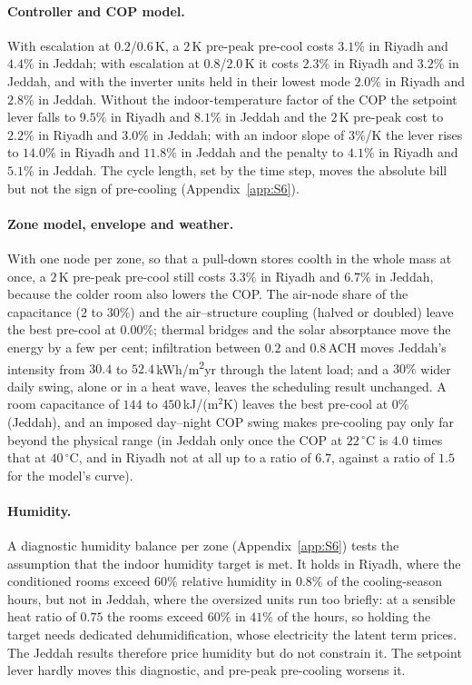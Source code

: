 \documentclass[10pt,a4paper,twocolumn]{article}
\theoremstyle{definition}
\begin{document}
\paragraph{Controller and COP model.} With escalation at $0.2$/$0.6\,$K, a $2\,$K pre-peak pre-cool costs $3.1\%$ in Riyadh and $4.4\%$ in Jeddah; with escalation at $0.8$/$2.0\,$K it costs $2.3\%$ in Riyadh and $3.2\%$ in Jeddah, and with the inverter units held in their lowest mode $2.0\%$ in Riyadh and $2.8\%$ in Jeddah. Without the indoor-temperature factor of the COP the setpoint lever falls to $9.5\%$ in Riyadh and $8.1\%$ in Jeddah and the $2\,$K pre-peak cost to $2.2\%$ in Riyadh and $3.0\%$ in Jeddah; with an indoor slope of $3\%$/K the lever rises to $14.0\%$ in Riyadh and $11.8\%$ in Jeddah and the penalty to $4.1\%$ in Riyadh and $5.1\%$ in Jeddah. The cycle length, set by the time step, moves the absolute bill but not the sign of pre-cooling (Appendix~\ref{app:S6}).

\paragraph{Zone model, envelope and weather.} With one node per zone, so that a pull-down stores coolth in the whole mass at once, a $2\,$K pre-peak pre-cool still costs $3.3\%$ in Riyadh and $6.7\%$ in Jeddah, because the colder room also lowers the COP. The air-node share of the capacitance ($2$ to $30\%$) and the air--structure coupling (halved or doubled) leave the best pre-cool at $0.00$\%; thermal bridges and the solar absorptance move the energy by a few per cent; infiltration between $0.2$ and $0.8\,$ACH moves Jeddah's intensity from $30.4$ to $52.4\,$kWh/m\textsuperscript{2}yr through the latent load; and a $30\%$ wider daily swing, alone or in a heat wave, leaves the scheduling result unchanged. A room capacitance of $144$ to $450\,$kJ/(m$^2$K) leaves the best pre-cool at $0$\% (Jeddah), and an imposed day--night COP swing makes pre-cooling pay only far beyond the physical range (in Jeddah only once the COP at $22\,^{\circ}$C is $4.0$ times that at $40\,^{\circ}$C, and in Riyadh not at all up to a ratio of $6.7$, against a ratio of $1.5$ for the model's curve).

\paragraph{Humidity.} A diagnostic humidity balance per zone (Appendix~\ref{app:S6}) tests the assumption that the indoor humidity target is met. It holds in Riyadh, where the conditioned rooms exceed $60\%$ relative humidity in $0.8\%$ of the cooling-season hours, but not in Jeddah, where the oversized units run too briefly: at a sensible heat ratio of $0.75$ the rooms exceed $60\%$ in $41\%$ of the hours, so holding the target needs dedicated dehumidification, whose electricity the latent term prices. The Jeddah results therefore price humidity but do not constrain it. The setpoint lever hardly moves this diagnostic, and pre-peak pre-cooling worsens it.
\end{document}
